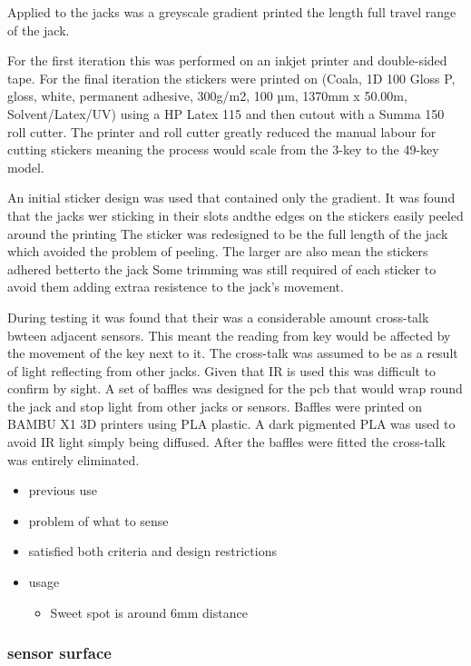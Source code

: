 Applied to the jacks was a greyscale gradient printed the length full
travel range of the jack.

For the first iteration this was performed on an inkjet printer and
double-sided tape. For the final iteration the stickers were printed on
(Coala, 1D 100 Gloss P, gloss, white, permanent adhesive, 300g/m2, 100
µm, 1370mm x 50.00m, Solvent/Latex/UV) using a HP Latex 115 and then
cutout with a Summa 150 roll cutter. The printer and roll cutter greatly
reduced the manual labour for cutting stickers meaning the process would
scale from the 3-key to the 49-key model.

An initial sticker design was used that contained only the gradient. It
was found that the jacks wer sticking in their slots andthe edges on the
stickers easily peeled around the printing The sticker was redesigned to
be the full length of the jack which avoided the problem of peeling. The
larger are also mean the stickers adhered betterto the jack Some
trimming was still required of each sticker to avoid them adding extraa
resistence to the jack's movement.

During testing it was found that their was a considerable amount
cross-talk bwteen adjacent sensors. This meant the reading from key
would be affected by the movement of the key next to it. The cross-talk
was assumed to be as a result of light reflecting from other jacks.
Given that IR is used this was difficult to confirm by sight. A set of
baffles was designed for the pcb that would wrap round the jack and stop
light from other jacks or sensors. Baffles were printed on BAMBU X1 3D
printers using PLA plastic. A dark pigmented PLA was used to avoid IR
light simply being diffused. After the baffles were fitted the
cross-talk was entirely eliminated.

\begin{itemize}
\tightlist
\item
  previous use
\item
  problem of what to sense
\item
  satisfied both criteria and design restrictions
\item
  usage

  \begin{itemize}
  \tightlist
  \item
    Sweet spot is around 6mm distance
  \end{itemize}
\end{itemize}

\subsubsection{sensor surface}\label{sensor-surface}

